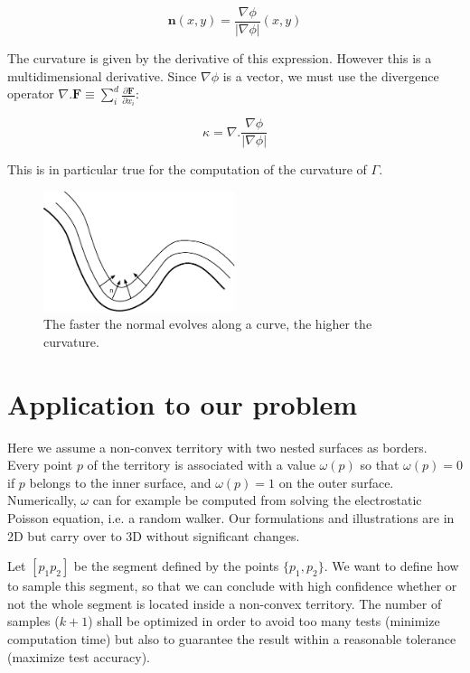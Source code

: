 \documentclass[11pt,a4paper]{article}
\begin{document}
	\begin{equation}
	\mathbf{n}(x,y) = \frac{\nabla \phi}{|\nabla \phi|}(x,y)
	\end{equation}
	
	The curvature is given by the derivative of this expression. However this is a multidimensional derivative. Since $\nabla \phi$ is a vector, we must use the divergence operator $\nabla . \mathbf{F} \equiv \sum_i^d \frac{\partial \mathbf{F}}{\partial x_i}$:
	
	\begin{equation}
	\kappa = \nabla . \frac{\nabla \phi}{|\nabla \phi|}
	\end{equation}
	
	This is in particular true for the computation of the curvature of $\Gamma$. 
	
		\begin{figure}
			\centering
			\includegraphics[width=0.5\textwidth]{Drawings/Distance.pdf}
			\caption{The faster the normal evolves along a curve, the higher the curvature.}
		\end{figure}
		
	\section{Application to our problem}
	
Here we assume a non-convex territory with two nested surfaces as borders. Every point $p$ of the territory is associated with a value $\omega(p)$ so that $\omega(p) = 0$ if $p$ belongs to the inner surface, and $\omega(p) = 1$ on the outer surface. Numerically, $\omega$ can for example be computed from solving the electrostatic Poisson equation, i.e. a random walker. Our formulations and illustrations are in 2D but carry over to 3D without significant changes.


Let $[p_1p_2]$ be the segment defined by the points $\{p_1, p_2\}$. We want to define how to sample this segment, so that we can conclude with high confidence whether or not the whole segment is located inside a non-convex territory. The number of samples ($k + 1$) shall be optimized in order to avoid too many tests (minimize computation time) but also to guarantee the result within a reasonable tolerance (maximize test accuracy).
\end{document}

